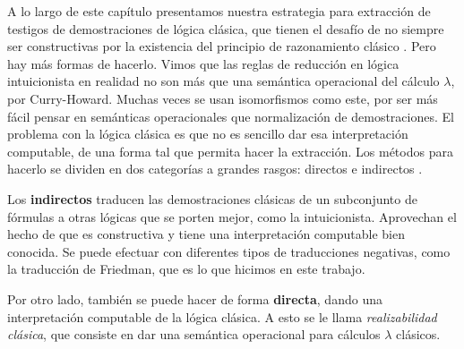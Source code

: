 A lo largo de este capítulo presentamos nuestra estrategia para extracción de testigos de demostraciones de lógica clásica, que tienen el desafío de no siempre ser constructivas por la existencia del principio de razonamiento clásico . Pero hay más formas de hacerlo.
Vimos que las reglas de reducción en lógica intuicionista en realidad no son más que una semántica operacional del cálculo $\lambda$, por Curry-Howard. Muchas veces se usan isomorfismos como este, por ser más fácil pensar en semánticas operacionales que normalización de demostraciones. El problema con la lógica clásica es que no es sencillo dar esa interpretación computable, de una forma tal que permita hacer la extracción. Los métodos para hacerlo se dividen en dos categorías a grandes rasgos: directos e indirectos \cite{miquel-friedman}.

Los \textbf{indirectos} traducen las demostraciones clásicas de un subconjunto de fórmulas a otras lógicas que se porten mejor, como la intuicionista. Aprovechan el hecho de que es constructiva y tiene una interpretación computable bien conocida. Se puede efectuar con diferentes tipos de traducciones negativas, como la traducción de Friedman, que es lo que hicimos en este trabajo.

Por otro lado, también se puede hacer de forma \textbf{directa}, dando una interpretación computable de la lógica clásica. A esto se le llama \textit{realizabilidad clásica}, que consiste en dar una semántica operacional para cálculos $\lambda$ clásicos.